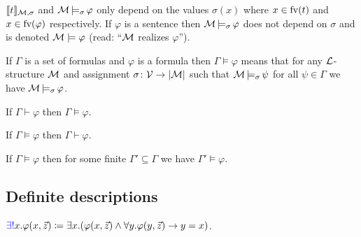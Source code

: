\begin{rem}
    $\llbracket t \rrbracket_{\mathcal{M}, \sigma}$ and $\mathcal{M} \operatorname{\models_{\sigma}} \varphi$ only depend on the values $\sigma(x)$ where $x \in \text{fv}(t)$ and $x \in \text{fv}(\varphi)$ respectively.
    If $\varphi$ is a sentence then $\mathcal{M} \operatorname{\models_{\sigma}} \varphi$ does not depend on $\sigma$ and is denoted \alert{$\mathcal{M} \models \varphi$} (read: ``$\mathcal{M}$ realizes $\varphi$'').
\end{rem}

\begin{boxdef}
\begin{defi}
    If $\Gamma$ is a set of formulas and $\varphi$ is a formula then \alert{$\Gamma \models \varphi$} means that for any $\mathcal{L}$-structure $\mathcal{M}$ and assignment $\sigma \colon \mathcal{V} \to \lvert \mathcal{M} \rvert$ such that $\mathcal{M} \operatorname{\models_{\sigma}} \psi$ for all $\psi \in \Gamma$ we have $\mathcal{M} \operatorname{\models_{\sigma}} \varphi$.
\end{defi}
\end{boxdef}

\begin{boxthe}
\begin{thm}
    If $\Gamma \vdash \varphi$ then $\Gamma \models \varphi$.
\end{thm}
\end{boxthe}

\begin{boxthe}
\begin{thm}
    If $\Gamma \models \varphi$ then $\Gamma \vdash \varphi$.
\end{thm}
\end{boxthe}

\begin{boxthe}
\begin{thm}
    If $\Gamma \models \varphi$ then for some finite $\Gamma' \subseteq \Gamma$ we have $\Gamma' \models \varphi$.
\end{thm}
\end{boxthe}

\subsection{Definite descriptions}

\begin{boxdef}
\begin{defi}
    $\alert{\exists!}x. \varphi(x, \vec{z}) \coloneq \exists x. (\varphi(x, \vec{z}) \wedge \forall y. \varphi(y, \vec{z}) \to y = x)$.
\end{defi}
\end{boxdef}

